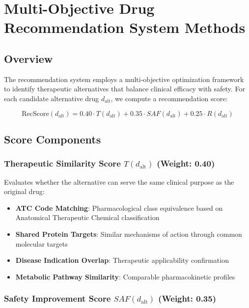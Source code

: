 \documentclass[11pt,a4paper]{article}
\begin{document}
\section*{Multi-Objective Drug Recommendation System Methods}

\subsection*{Overview}

The recommendation system employs a multi-objective optimization framework to identify therapeutic alternatives that balance clinical efficacy with safety. For each candidate alternative drug $d_{\text{alt}}$, we compute a recommendation score:

\begin{equation}
\text{RecScore}(d_{\text{alt}}) = 0.40 \cdot T(d_{\text{alt}}) + 0.35 \cdot SAF(d_{\text{alt}}) + 0.25 \cdot R(d_{\text{alt}})
\end{equation}

\subsection*{Score Components}

\subsubsection*{Therapeutic Similarity Score $T(d_{\text{alt}})$ (Weight: 0.40)}

Evaluates whether the alternative can serve the same clinical purpose as the original drug:

\begin{itemize}
    \item \textbf{ATC Code Matching}: Pharmacological class equivalence based on Anatomical Therapeutic Chemical classification
    \item \textbf{Shared Protein Targets}: Similar mechanisms of action through common molecular targets
    \item \textbf{Disease Indication Overlap}: Therapeutic applicability confirmation
    \item \textbf{Metabolic Pathway Similarity}: Comparable pharmacokinetic profiles
\end{itemize}

\subsubsection*{Safety Improvement Score $SAF(d_{\text{alt}})$ (Weight: 0.35)}
\end{document}
